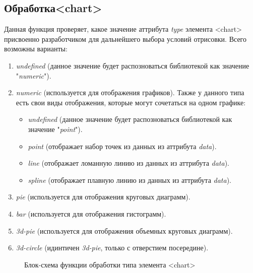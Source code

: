 \documentclass[a4paper,14pt]{extreport}
\begin{document}
\subsection{Обработка\enspace<chart>}
\hspace{4ex}Данная функция проверяет, какое значение аттрибута \textit{type} элемента <chart> присвоенно разработчиком для дальнейшего выбора условий отрисовки. Всего возможны варианты:
\begin{enumerate}
	\item \textit{undefined} (данное значение будет распозноваться библиотекой как значение "\textit{numeric}").
	\item \textit{numeric} (используется для отображения графиков). Также у данного типа есть свои виды отображения, которые могут сочетаться на одном графике:
	\begin{itemize}
		\item \textit{undefined} (данное значение будет распозноваться библиотекой как значение "\textit{point}").
		\item \textit{point} (отображает набор точек из данных из аттрибута \textit{data}).
		\item \textit{line} (отображает ломанную линию из данных из аттрибута \textit{data}).
		\item \textit{spline} (отображает плавную линию из данных из аттрибута \textit{data}).
	\end{itemize}	 
	\item \textit{pie} (используется для отображения круговых диаграмм).
	\item \textit{bar} (используется для отображения гистограмм).
	\item \textit{3d-pie} (используется для отображения объемных круговых диаграмм).
	\item \textit{3d-circle} (идинтичен \textit{3d-pie}, только с отверстием посередине).
	
\end{enumerate}
\begin{figure}[h]
\caption{Блок-схема функции обработки типа элемента <chart>}
\label{ris:image}
\end{figure}
\end{document}
